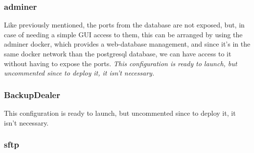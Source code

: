 \documentclass[11pt]{article}
\begin{document}
    \subsubsection[Adminer]{adminer}
    \begin{flushleft}
        Like previously mentioned, the ports from the database are not exposed, but, in case of needing a simple GUI
        access to them, this can be arranged by using the adminer docker, which provides a web-database management,
        and since it's in the same docker network than the postgresql database, we can have access to it without having
        to expose the ports.
        \textit{This configuration is ready to launch, but uncommented since to deploy it, it isn't necessary.}
    \end{flushleft}

    \subsubsection[Backup\_dealer]{BackupDealer}
    \begin{flushleft}

       This configuration is ready to launch, but uncommented since to deploy it, it isn't necessary.
    \end{flushleft}

    \subsubsection[sftp]{sftp}
    \begin{flushleft}

    \end{flushleft}
\end{document}
